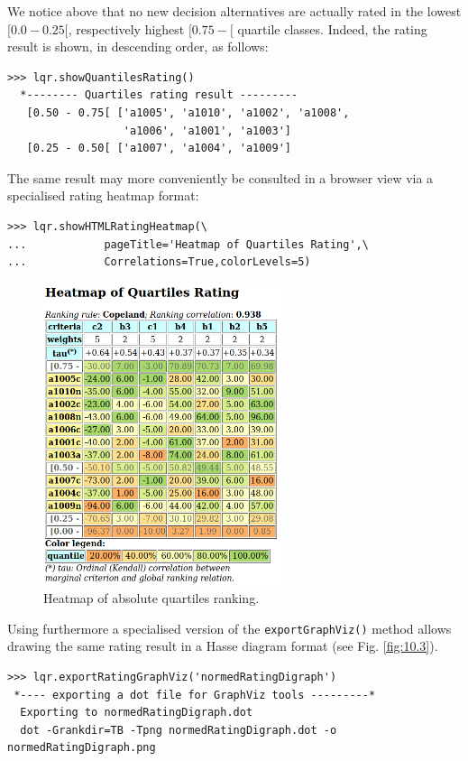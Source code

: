 We notice above that no new decision alternatives are actually rated in the lowest $[0.0-0.25[$, respectively highest $[0.75- [$ quartile classes. Indeed, the rating result is shown, in descending order, as follows:

\begin{lstlisting}[caption={Absolute quartiles rating result},label=list:10.8]
>>> lqr.showQuantilesRating()
  *-------- Quartiles rating result ---------
   [0.50 - 0.75[ ['a1005', 'a1010', 'a1002', 'a1008',
                  'a1006', 'a1001', 'a1003']
   [0.25 - 0.50[ ['a1007', 'a1004', 'a1009']
\end{lstlisting}    

The same result may more conveniently be consulted in a browser view via a specialised rating heatmap format: 

\begin{lstlisting}
>>> lqr.showHTMLRatingHeatmap(\
...            pageTitle='Heatmap of Quartiles Rating',\
...            Correlations=True,colorLevels=5)
\end{lstlisting}

\begin{figure}[h]
\sidecaption
 \includegraphics[width=7cm]{Figures/heatMap1.png}
\caption{Heatmap of absolute quartiles ranking.}
\label{fig:10.2}       %
\end{figure}
	    
Using furthermore a specialised version of the \texttt{exportGraphViz()} method allows drawing the same rating result in a Hasse diagram format (see Fig. \ref{fig:10.3}).

\begin{lstlisting}
>>> lqr.exportRatingGraphViz('normedRatingDigraph')
 *---- exporting a dot file for GraphViz tools ---------*
  Exporting to normedRatingDigraph.dot
  dot -Grankdir=TB -Tpng normedRatingDigraph.dot -o normedRatingDigraph.png
\end{lstlisting}

